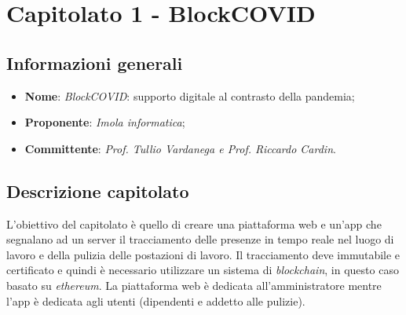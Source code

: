 \section{Capitolato 1 - BlockCOVID}
\subsection{Informazioni generali}
\begin{itemize}
    \item \textbf{Nome}: \emph{BlockCOVID}: supporto digitale al contrasto della pandemia;
    \item \textbf{Proponente}: \emph{Imola informatica};
    \item \textbf{Committente}: \emph{Prof. Tullio Vardanega e Prof. Riccardo Cardin}.
\end{itemize}
\subsection{Descrizione capitolato}
L'obiettivo del capitolato è quello di creare una piattaforma web e un'app che segnalano ad un server il tracciamento delle presenze in tempo reale nel luogo di lavoro e della pulizia delle postazioni di lavoro. Il tracciamento deve immutabile e certificato e quindi è necessario utilizzare un sistema di \emph{blockchain}, in questo caso basato su \emph{ethereum}. La piattaforma web è dedicata all'amministratore mentre l'app è dedicata agli utenti (dipendenti e addetto alle pulizie).
